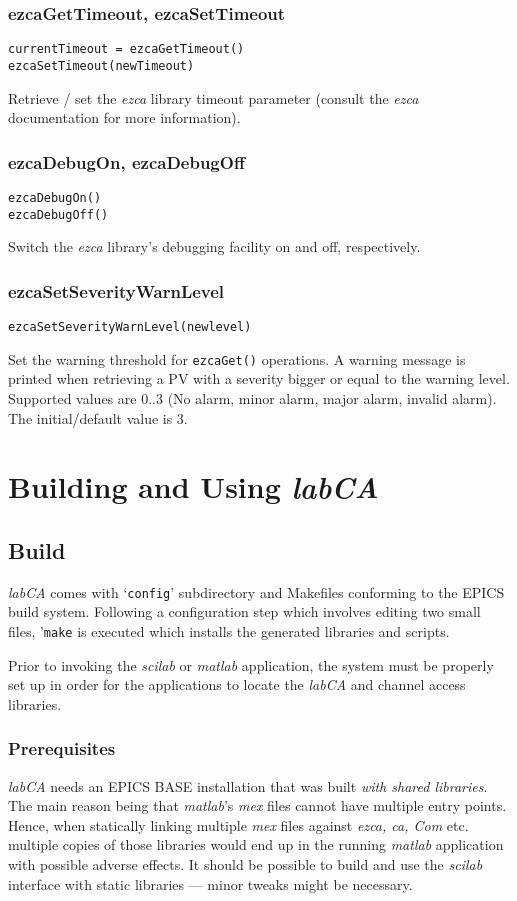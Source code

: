 \documentclass{article}
\newcommand{\sca}{{\em labCA}}
\newcommand{\scilab}{{\em scilab}}
\newcommand{\matlab}{{\em matlab}}
\newcommand{\ezca}{{\em ezca}}
\newcommand{\com}[1]{{\tt #1}}
\begin{document}
\subsubsection{ezcaGetTimeout, ezcaSetTimeout}
\begin{verbatim}
currentTimeout = ezcaGetTimeout()
ezcaSetTimeout(newTimeout)
\end{verbatim}
Retrieve / set the \ezca{} library timeout parameter (consult the \ezca{}
documentation for more information).

\subsubsection{ezcaDebugOn, ezcaDebugOff}
\begin{verbatim}
ezcaDebugOn()
ezcaDebugOff()
\end{verbatim}
Switch the \ezca{} library's debugging facility on and off, respectively.

\subsubsection{ezcaSetSeverityWarnLevel}
\label{swarnlevel}
\begin{verbatim}
ezcaSetSeverityWarnLevel(newlevel)
\end{verbatim}
Set the warning threshold for \com{ezcaGet()} operations.
A warning message is printed when retrieving a PV with a severity bigger
or equal to the warning level. Supported values are $0..3$ (No alarm,
minor alarm, major alarm, invalid alarm). The initial/default value is 3.

\section{Building and Using \sca{}}
\subsection{Build}
\sca{} comes with `{\tt config}' subdirectory and Makefiles conforming to the
EPICS build system. Following a configuration step which involves editing
two small files, '{\tt make} is executed which installs the generated libraries
and scripts.

Prior to invoking the \scilab{} or \matlab{} application, the system
must be properly set up in order for the applications to locate the
\sca{} and channel access libraries.

\subsubsection{Prerequisites}
\sca{} needs an EPICS BASE installation that was built {\em with shared
libraries}. The main reason being that \matlab's {\em mex} files cannot
have multiple entry points. Hence, when statically linking multiple {\em mex}
files against {\em ezca, ca, Com} etc. multiple copies of those libraries
would end up in the running \matlab{} application with possible adverse
effects. It should be possible to build and use the \scilab{} interface
with static libraries --- minor tweaks might be necessary.
\end{document}

